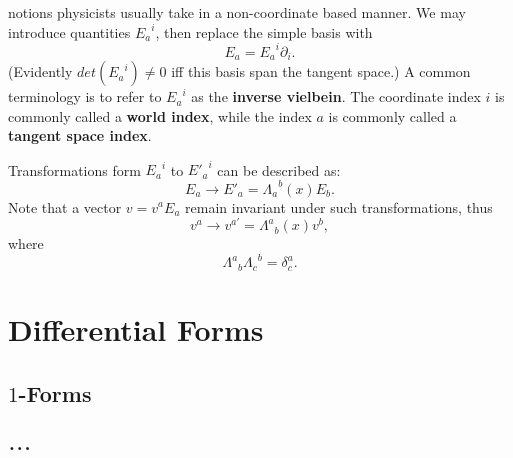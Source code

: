 \documentclass[a4paper,11pt]{article}
\theoremstyle{remark}
\begin{document}
notions physicists usually take in a non-coordinate based manner. We
may introduce quantities ${E_a}^i$, then replace the simple basis
with $$E_a = {E_a}^i\partial_i.$$ (Evidently $det({E_a}^i)\neq 0$
iff this basis span the tangent space.) A common terminology is to
refer to ${E_a}^i$ as the \textbf{inverse vielbein}. The coordinate
index $i$ is commonly called a \textbf{world index}, while the index
$a$ is commonly called a \textbf{tangent space index}.\par
Transformations form ${E_a}^i$ to ${E'_a}^i$ can be described
as: $$E_a\rightarrow E'_a = {\Lambda_a}^b(x)E_b.$$ Note that a vector
$v = v^aE_a$ remain invariant under such transformations,
thus $$v^a\rightarrow v^{a '} = {\Lambda^a}_b(x)v^b,$$
where $${\Lambda^a}_b{\Lambda_c}^b = \delta^a_c.$$
\section{Differential Forms}
\subsection{$1$-Forms}
\section{$\ldots$}



\end{document}

